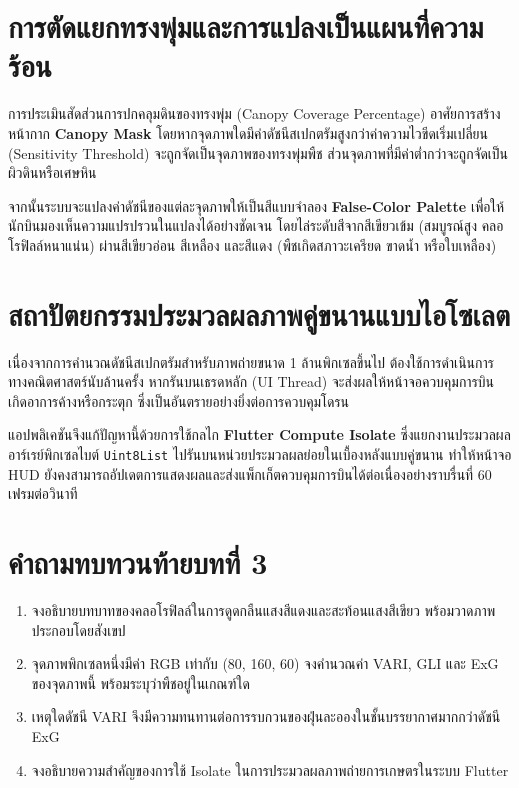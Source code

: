 \section{การตัดแยกทรงพุ่มและการแปลงเป็นแผนที่ความร้อน}

การประเมินสัดส่วนการปกคลุมดินของทรงพุ่ม (Canopy Coverage Percentage) อาศัยการสร้างหน้ากาก \textbf{Canopy Mask} โดยหากจุดภาพใดมีค่าดัชนีสเปกตรัมสูงกว่าค่าความไวขีดเริ่มเปลี่ยน (Sensitivity Threshold) จะถูกจัดเป็นจุดภาพของทรงพุ่มพืช ส่วนจุดภาพที่มีค่าต่ำกว่าจะถูกจัดเป็นผิวดินหรือเศษหิน

จากนั้นระบบจะแปลงค่าดัชนีของแต่ละจุดภาพให้เป็นสีแบบจำลอง \textbf{False-Color Palette} เพื่อให้นักบินมองเห็นความแปรปรวนในแปลงได้อย่างชัดเจน โดยไล่ระดับสีจากสีเขียวเข้ม (สมบูรณ์สูง คลอโรฟิลล์หนาแน่น) ผ่านสีเขียวอ่อน สีเหลือง และสีแดง (พืชเกิดสภาวะเครียด ขาดน้ำ หรือใบเหลือง)

\section{สถาปัตยกรรมประมวลผลภาพคู่ขนานแบบไอโซเลต}

เนื่องจากการคำนวณดัชนีสเปกตรัมสำหรับภาพถ่ายขนาด 1 ล้านพิกเซลขึ้นไป ต้องใช้การดำเนินการทางคณิตศาสตร์นับล้านครั้ง หากรันบนเธรดหลัก (UI Thread) จะส่งผลให้หน้าจอควบคุมการบินเกิดอาการค้างหรือกระตุก ซึ่งเป็นอันตรายอย่างยิ่งต่อการควบคุมโดรน

แอปพลิเคชันจึงแก้ปัญหานี้ด้วยการใช้กลไก \textbf{Flutter Compute Isolate} ซึ่งแยกงานประมวลผลอาร์เรย์พิกเซลไบต์ \texttt{Uint8List} ไปรันบนหน่วยประมวลผลย่อยในเบื้องหลังแบบคู่ขนาน ทำให้หน้าจอ HUD ยังคงสามารถอัปเดตการแสดงผลและส่งแพ็กเก็ตควบคุมการบินได้ต่อเนื่องอย่างราบรื่นที่ 60 เฟรมต่อวินาที

\clearpage

\section*{คำถามทบทวนท้ายบทที่ 3}

\begin{enumerate}
    \item จงอธิบายบทบาทของคลอโรฟิลล์ในการดูดกลืนแสงสีแดงและสะท้อนแสงสีเขียว พร้อมวาดภาพประกอบโดยสังเขป
    \item จุดภาพพิกเซลหนึ่งมีค่า RGB เท่ากับ (80, 160, 60) จงคำนวณค่า VARI, GLI และ ExG ของจุดภาพนี้ พร้อมระบุว่าพืชอยู่ในเกณฑ์ใด
    \item เหตุใดดัชนี VARI จึงมีความทนทานต่อการรบกวนของฝุ่นละอองในชั้นบรรยากาศมากกว่าดัชนี ExG
    \item จงอธิบายความสำคัญของการใช้ Isolate ในการประมวลผลภาพถ่ายการเกษตรในระบบ Flutter
\end{enumerate}

\clearpage
